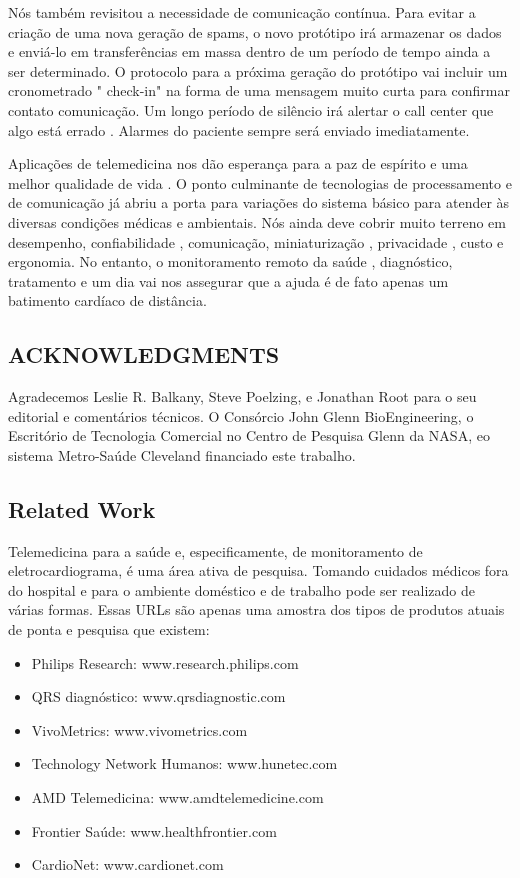 \documentclass[12pt]{article} %
\begin{document}
Nós também revisitou a necessidade de comunicação contínua. Para evitar a criação de uma nova geração de spams, o novo protótipo irá armazenar os dados e enviá-lo em transferências em massa dentro de um período de tempo ainda a ser determinado. O protocolo para a próxima geração do protótipo vai incluir um cronometrado " check-in" na forma de uma mensagem muito curta para confirmar contato comunicação. Um longo período de silêncio irá alertar o call center que algo está errado . Alarmes do paciente sempre será enviado imediatamente.

Aplicações de telemedicina nos dão esperança para a paz de espírito e uma melhor qualidade de vida . O ponto culminante de tecnologias de processamento e de comunicação já abriu a porta para variações do sistema básico para atender às diversas condições médicas e ambientais. Nós ainda deve cobrir muito terreno em desempenho, confiabilidade , comunicação, miniaturização , privacidade , custo e ergonomia. No entanto, o monitoramento remoto da saúde , diagnóstico, tratamento e um dia vai nos assegurar que a ajuda é de fato apenas um batimento cardíaco de distância.


\subsection{ACKNOWLEDGMENTS} %

Agradecemos Leslie R. Balkany, Steve Poelzing, e Jonathan Root para o seu editorial e comentários técnicos. O Consórcio John Glenn BioEngineering, o Escritório de Tecnologia Comercial no Centro de Pesquisa Glenn da NASA, eo sistema Metro-Saúde Cleveland financiado este trabalho.


\subsection{Related Work} %

Telemedicina para a saúde e, especificamente, de monitoramento de eletrocardiograma, é uma área ativa de pesquisa. Tomando cuidados médicos fora do hospital e para o ambiente doméstico e de trabalho pode ser realizado de várias formas. Essas URLs são apenas uma amostra dos tipos de produtos atuais de ponta e pesquisa que existem:
\begin{itemize}
	\item Philips Research: www.research.philips.com
	\item QRS diagnóstico: www.qrsdiagnostic.com
	\item VivoMetrics: www.vivometrics.com
	\item Technology Network Humanos: www.hunetec.com
	\item AMD Telemedicina: www.amdtelemedicine.com
	\item Frontier Saúde: www.healthfrontier.com
	\item CardioNet: www.cardionet.com
\end{itemize}
\end{document}
